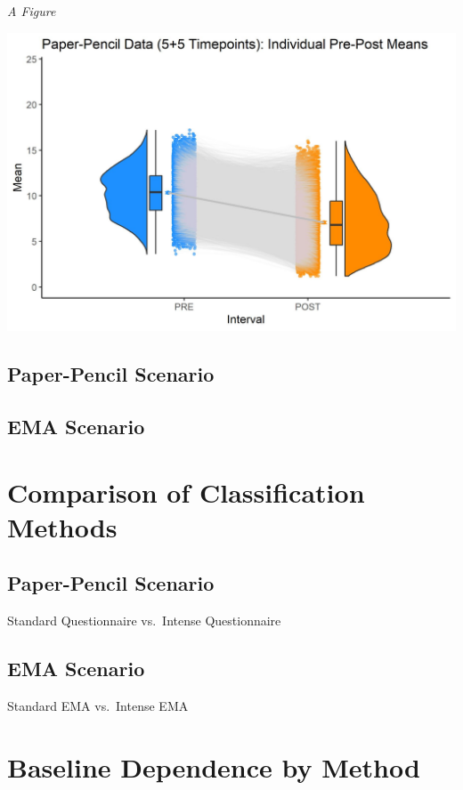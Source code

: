 \documentclass[12pt,twoside]{reedthesis}
\begin{document}
\caption{\textit{A Figure}} \label{fig:fig1}
\begin{center}
  \includegraphics[width=0.75\linewidth]{data/Time Series Dataframes/k20_PP_5.5_Pre-Post_Box_Violin_Mean+CI}
\end{center}
\hypertarget{paper-pencil-scenario-2}{%
\subsection{Paper-Pencil Scenario}\label{paper-pencil-scenario-2}}

\hypertarget{ema-scenario-2}{%
\subsection{EMA Scenario}\label{ema-scenario-2}}

\hypertarget{comparison-of-classification-methods}{%
\section{Comparison of Classification Methods}\label{comparison-of-classification-methods}}

\hypertarget{paper-pencil-scenario-3}{%
\subsection{Paper-Pencil Scenario}\label{paper-pencil-scenario-3}}

Standard Questionnaire vs.~Intense Questionnaire

\hypertarget{ema-scenario-3}{%
\subsection{EMA Scenario}\label{ema-scenario-3}}

Standard EMA vs.~Intense EMA

\hypertarget{baseline-dependence-by-method}{%
\section{Baseline Dependence by Method}\label{baseline-dependence-by-method}}
\end{document}
